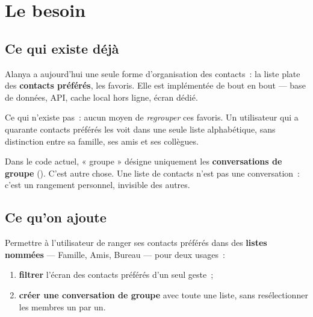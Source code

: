 
\chapter{Le besoin}

\section{Ce qui existe déjà}

Alanya a aujourd'hui une seule forme d'organisation des contacts~: la liste plate des
\textbf{contacts préférés}, les favoris. Elle est implémentée de bout en bout --- base de
données, API, cache local hors ligne, écran dédié.

Ce qui n'existe pas~: aucun moyen de \emph{regrouper} ces favoris. Un utilisateur qui a
quarante contacts préférés les voit dans une seule liste alphabétique, sans distinction
entre sa famille, ses amis et ses collègues.

\begin{alerte}
Dans le code actuel, « groupe » désigne uniquement les \textbf{conversations de groupe}
(). C'est autre chose. Une liste de contacts n'est pas une
conversation~: c'est un rangement personnel, invisible des autres.
\end{alerte}

\section{Ce qu'on ajoute}

Permettre à l'utilisateur de ranger ses contacts préférés dans des \textbf{listes nommées}
--- Famille, Amis, Bureau --- pour deux usages~:

\begin{enumerate}[leftmargin=1.6em]
  \item \textbf{filtrer} l'écran des contacts préférés d'un seul geste~;
  \item \textbf{créer une conversation de groupe} avec toute une liste, sans resélectionner
        les membres un par un.
\end{enumerate}

